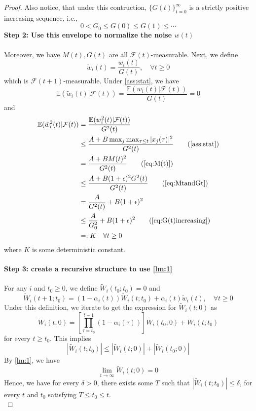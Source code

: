 \begin{proof}
\noindent Also notice, that under this contruction, $\{G(t)\}_{t=0}^\infty$ is a strictly positive increasing sequence, i.e.,
\begin{equation}
   0< G_0\le G(0) \le G(1) \le \cdots
\end{equation}\label{eq:G(t)increasing}
\textbf{Step 2: Use this envelope to normalize the noise $w(t)$}\\
\\
Moreover, we have $M(t),G(t)$ are all $\mathcal{F}(t)$-measurable. Next, we define
$$
\tilde w_i(t) = \frac{w_i(t)}{G(t)},\quad \forall t\ge 0
$$
which is $\mathcal{F}(t+1)$-measurable. Under \autoref{ass:stat}, we have
$$
\mathbb{E}(\tilde w_i(t)|\mathcal{F}(t)) = \frac{\mathbb{E}(w_i(t)|\mathcal{F}(t))}{G(t)} = 0
$$
and
\begin{align*}
    \mathbb{E}(\tilde w_i^2(t)|\mathcal{F}(t)) &= \frac{\mathbb{E}(w_i^2(t)|\mathcal{F}(t))}{G^2(t)}\\
    &\le \frac{A + B \max_j\max_{\tau\le t}|x_j(\tau)|^2}{G^2(t)}\tag{\autoref{ass:stat}}\\
    &= \frac{A + B M(t)^2}{G^2(t)}\tag{\autoref{eq:M(t)}}\\
    &\le \frac{A+B(1+\epsilon)^2G^2(t)}{G^2(t)}\tag{\autoref{eq:MtandGt}}\\
    &= \frac{A}{G^2(t)} + B(1+\epsilon)^2 \\
    &\le \frac{A}{G_0^2} + B(1+\epsilon)^2 \tag{\autoref{eq:G(t)increasing}}\\
    &=:K\quad \forall t\ge 0
\end{align*}
where $K$ is some deterministic constant.\\
\\
\textbf{Step 3: create a recursive structure to use \autoref{lm:1}}\\
\\
For any $i$ and $t_0\ge 0$, we define $\tilde W_i(t_0;t_0) = 0$ and
\begin{equation}\label{eq:tildeW}
    \tilde W_i(t+1; t_0) = (1-\alpha_i(t))\tilde W_i(t;t_0) + \alpha_i(t)\tilde w_i(t),\quad \forall t\ge 0
\end{equation}
\noindent Under this definition, we iterate to get the expression for $\tilde W_i(t;0)$ as
$$
\tilde W_i(t;0) = \left[\prod_{\tau = t_0}^{t-1} (1-\alpha_i(\tau))\right]\tilde W_i(t_0;0) + \tilde W_i(t;t_0)
$$
for every $t\ge t_0$. This implies
$$
|\tilde W_i(t;t_0)|\le |\tilde W_i(t;0)| + |\tilde W_i(t_0;0)|
$$
By \autoref{lm:1}, we have 
$$
\lim_{t\to\infty} \tilde W_i(t;0) = 0
$$
Hence, we have for every $\delta >0$, there exists some $T$ such that $|\tilde W_i(t;t_0)|\le \delta$, for every $t$ and $t_0$ satisfying $T\le t_0\le t$.\\

\end{proof}
